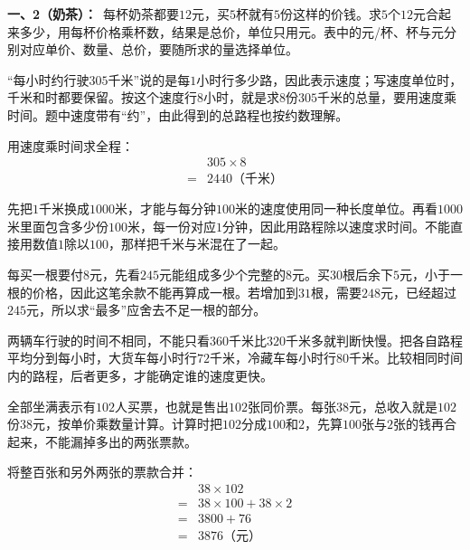 \documentclass[multi=snippet,border=0pt]{standalone}
\newenvironment{snippet}[3]{\begin{minipage}{#1bp}\color{answerred}\fontsize{#2}{#3}\selectfont\raggedright}{\end{minipage}}
\begin{document}
\begin{snippet}{505}{11.5}{14}\textbf{一、2（奶茶）：}\ 每杯奶茶都要\(12\)元，买\(5\)杯就有\(5\)份这样的价钱。求\(5\)个\(12\)元合起来多少，用每杯价格乘杯数，结果是总价，单位只用元。表中的元/杯、杯与元分别对应单价、数量、总价，要随所求的量选择单位。\end{snippet}
\begin{snippet}{505}{11.5}{14}“每小时约行驶\(305\)千米”说的是每\(1\)小时行多少路，因此表示速度；写速度单位时，千米和时都要保留。按这个速度行\(8\)小时，就是求\(8\)份\(305\)千米的总量，要用速度乘时间。题中速度带有“约”，由此得到的总路程也按约数理解。\par 用速度乘时间求全程：\[\begin{aligned}&305\times8\\={}&2440\text{（千米）}\end{aligned}\]\end{snippet}
\begin{snippet}{505}{11.5}{14}先把\(1\)千米换成\(1000\)米，才能与每分钟\(100\)米的速度使用同一种长度单位。再看\(1000\)米里面包含多少份\(100\)米，每一份对应\(1\)分钟，因此用路程除以速度求时间。不能直接用数值\(1\)除以\(100\)，那样把千米与米混在了一起。\end{snippet}
\begin{snippet}{505}{11.5}{14}每买一根要付\(8\)元，先看\(245\)元能组成多少个完整的\(8\)元。买\(30\)根后余下\(5\)元，小于一根的价格，因此这笔余款不能再算成一根。若增加到\(31\)根，需要\(248\)元，已经超过\(245\)元，所以求“最多”应舍去不足一根的部分。\end{snippet}
\begin{snippet}{505}{11.5}{14}两辆车行驶的时间不相同，不能只看\(360\)千米比\(320\)千米多就判断快慢。把各自路程平均分到每小时，大货车每小时行\(72\)千米，冷藏车每小时行\(80\)千米。比较相同时间内的路程，后者更多，才能确定谁的速度更快。\end{snippet}
\begin{snippet}{505}{11.5}{14}全部坐满表示有\(102\)人买票，也就是售出\(102\)张同价票。每张\(38\)元，总收入就是\(102\)份\(38\)元，按单价乘数量计算。计算时把\(102\)分成\(100\)和\(2\)，先算\(100\)张与\(2\)张的钱再合起来，不能漏掉多出的两张票款。\par 将整百张和另外两张的票款合并：\[\begin{aligned}&38\times102\\={}&38\times100+38\times2\\={}&3800+76\\={}&3876\text{（元）}\end{aligned}\]\end{snippet}
\end{document}
